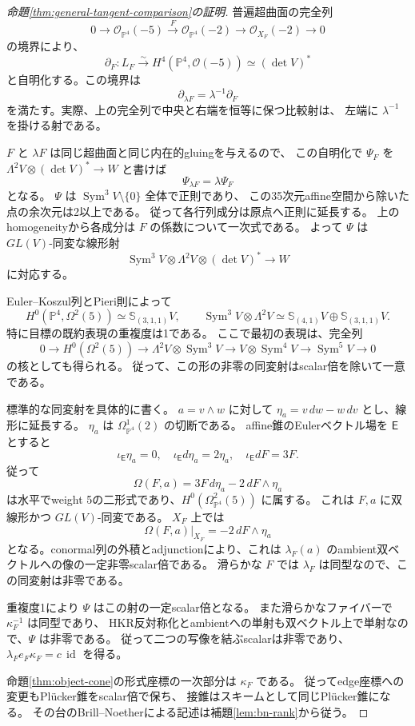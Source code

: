 \documentclass[a4paper,11pt]{ltjsarticle}
\theoremstyle{definition}
\newcommand{\OO}{\mathcal O}
\newcommand{\PP}{\mathbb P}
\newcommand{\Sym}{\operatorname{Sym}}
\newcommand{\id}{\operatorname{id}}
\begin{document}
\begin{proof}[命題\ref{thm:general-tangent-comparison}の証明]
普遍超曲面の完全列
\[
 0\longrightarrow\OO_{\PP^4}(-5)
 \xrightarrow{\ F\ }\OO_{\PP^4}(-2)
 \longrightarrow\OO_{X_F}(-2)\longrightarrow0
\]
の境界により、
\[
 \partial_F:L_F\xrightarrow{\sim}
 H^4(\PP^4,\OO(-5))\simeq(\det V)^*
\]
と自明化する。この境界は
\[
                         \partial_{\lambda F}=\lambda^{-1}\partial_F
\]
を満たす。実際、上の完全列で中央と右端を恒等に保つ比較射は、
左端に $\lambda^{-1}$ を掛ける射である。

$F$ と $\lambda F$ は同じ超曲面と同じ内在的gluingを与えるので、
この自明化で $\Psi_F$ を
$\Lambda^2V\otimes(\det V)^*\to W$ と書けば
\[
                            \Psi_{\lambda F}=\lambda\Psi_F
\]
となる。
$\Psi$ は $\Sym^3V\setminus\{0\}$ 全体で正則であり、
この35次元affine空間から除いた点の余次元は2以上である。
従って各行列成分は原点へ正則に延長する。
上のhomogeneityから各成分は $F$ の係数について一次式である。
よって $\Psi$ は $GL(V)$-同変な線形射
\[
 \Sym^3V\otimes\Lambda^2V\otimes(\det V)^*
                   \longrightarrow W
\]
に対応する。

Euler--Koszul列とPieri則によって
\[
 H^0(\PP^4,\Omega^2(5))\simeq\mathbb S_{(3,1,1)}V,
 \qquad
 \Sym^3V\otimes\Lambda^2V
  \simeq\mathbb S_{(4,1)}V\oplus\mathbb S_{(3,1,1)}V.
\]
特に目標の既約表現の重複度は1である。
ここで最初の表現は、完全列
\[
 0\longrightarrow H^0(\Omega^2(5))
 \longrightarrow\Lambda^2V\otimes\Sym^3V
 \longrightarrow V\otimes\Sym^4V
 \longrightarrow\Sym^5V\longrightarrow0
\]
の核としても得られる。
従って、この形の非零の同変射はscalar倍を除いて一意である。

標準的な同変射を具体的に書く。
$a=v\wedge w$ に対して $\eta_a=v\,dw-w\,dv$ とし、線形に延長する。
$\eta_a$ は $\Omega^1_{\PP^4}(2)$ の切断である。
affine錐のEulerベクトル場を $\mathsf E$ とすると
\[
 \iota_{\mathsf E}\eta_a=0,\quad
 \iota_{\mathsf E}d\eta_a=2\eta_a,\quad
 \iota_{\mathsf E}dF=3F.
\]
従って
\[
                 \Omega(F,a)=3F\,d\eta_a-2\,dF\wedge\eta_a
\]
は水平でweight 5の二形式であり、$H^0(\Omega^2_{\PP^4}(5))$ に属する。
これは $F,a$ に双線形かつ $GL(V)$-同変である。
$X_F$ 上では
\[
                         \Omega(F,a)|_{X_F}=-2\,dF\wedge\eta_a
\]
となる。conormal列の外積とadjunctionにより、これは
$\lambda_F(a)$ のambient双ベクトルへの像の一定非零scalar倍である。
滑らかな $F$ では $\lambda_F$ は同型なので、この同変射は非零である。

重複度1により $\Psi$ はこの射の一定scalar倍となる。
また滑らかなファイバーで $\kappa_F^{-1}$ は同型であり、
HKR反対称化とambientへの単射も双ベクトル上で単射なので、$\Psi$ は非零である。
従って二つの写像を結ぶscalarは非零であり、
$\lambda_F e_F\kappa_F=c\,\id$ を得る。

命題\ref{thm:object-cone}の形式座標の一次部分は $\kappa_F$ である。
従ってedge座標への変更もPl\"ucker錐をscalar倍で保ち、
接錐はスキームとして同じPl\"ucker錐になる。
その台のBrill--Noetherによる記述は補題\ref{lem:bn-rank}から従う。
\end{proof}
\end{document}
